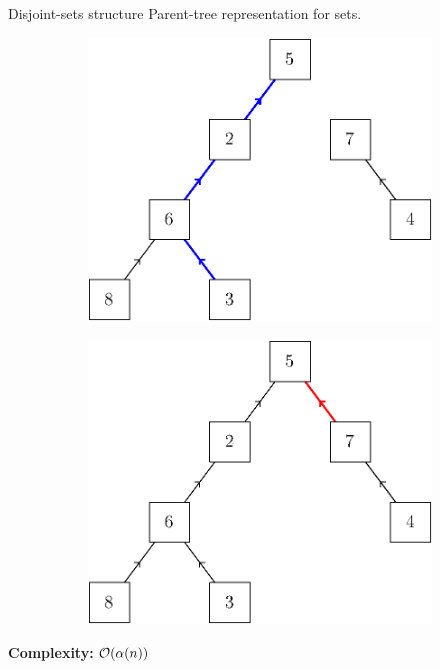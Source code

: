 \begin{frame}{Disjoint-sets structure}
	Parent-tree representation for sets.
	\begin{figure}
		\centering%
		\begin{subfigure}{0.45\textwidth}
			\includegraphics[width=\linewidth]{ds/disjoint_find}
		\end{subfigure}%
		\hspace{0.045\textwidth}%
		\vline%
		\hspace{0.045\textwidth}%
		\begin{subfigure}{0.45\textwidth}
			\includegraphics[width=\linewidth]{ds/disjoint_link}
		\end{subfigure}%
	\end{figure}
	\pause
	\textbf{Complexity: } $\mathcal{O}(\alpha(n))$ 
\end{frame}

